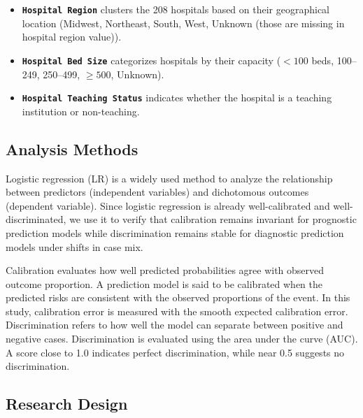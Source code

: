 \documentclass[10.7pt,]{article}
\begin{document}
\begin{itemize}
    \item \textbf{\texttt{Hospital Region}} clusters the 208 hospitals based on their geographical location (Midwest, Northeast, South, West, Unknown (those are missing in hospital region value)).
    \item \textbf{\texttt{Hospital Bed Size}} categorizes hospitals by their capacity (\(<100\) beds, 100--249, 250--499, \(\geq500\), Unknown).
    \item \textbf{\texttt{Hospital Teaching Status}} indicates whether the hospital is a teaching institution or non-teaching.
\end{itemize}


\subsection{Analysis Methods}\label{Analysis Methods}

Logistic regression (LR) is a widely used method to analyze the relationship between predictors (independent variables) and dichotomous outcomes (dependent variable). Since logistic regression is already well-calibrated and well-discriminated, we use it to verify that calibration remains invariant for prognostic prediction models while discrimination remains stable for diagnostic prediction models under shifts in case mix.

Calibration evaluates how well predicted probabilities agree with observed outcome proportion. A prediction model is said to be calibrated when the predicted risks are consistent with the observed proportions of the event. In this study, calibration error is measured with the smooth expected calibration error.\cite{9} Discrimination refers to how well the model can separate between positive and negative cases. Discrimination is evaluated using the area under the curve (AUC). A score close to 1.0 indicates perfect discrimination, while near 0.5 suggests no discrimination.\cite{10} 


\subsection{Research Design}\label{Research Design}
\end{document}
